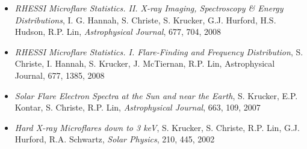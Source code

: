 \begin{itemize}
\item {\it RHESSI Microflare Statistics. II. X-ray Imaging, Spectroscopy \& Energy Distributions}, I. G. Hannah, S. Christe, S. Krucker, G.J. Hurford, H.S. Hudson, R.P. Lin, {\it Astrophysical Journal}, 677, 704, 2008

\item {\it RHESSI Microflare Statistics. I. Flare-Finding and Frequency Distribution}, S. Christe, I. Hannah, S. Krucker, J. McTiernan, R.P. Lin, Astrophysical Journal, 677, 1385, 2008

\item {\it Solar Flare Electron Spectra at the Sun and near the Earth}, S. Krucker, E.P. Kontar, S. Christe, R.P. Lin, {\it Astrophysical Journal}, 663, 109, 2007 

\item {\it Hard X-ray Microﬂares down to 3 keV}, S. Krucker, S. Christe, R.P. Lin, G.J. Hurford, R.A. Schwartz, {\it Solar Physics}, 210, 445, 2002

\end{itemize}